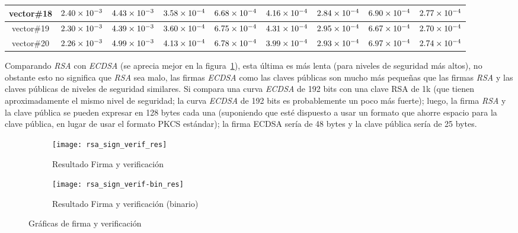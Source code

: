 \documentclass[../main.tex]{subfiles}
\begin{document}
\begin{table}[ht]
\begin{tabular}{|c|c|c|c|c|c|c|c|c|}
    \rowcolor[HTML]{C0C0C0}
    vector\#18 & $\num{2.40E-03}$ & $\num{4.43E-03}$ & $\num{3.58E-04}$ & $\num{6.68E-04}$ & $\num{4.16E-04}$ & $\num{2.84E-04}$ & $\num{6.90E-04}$ & $\num{2.77E-04}$ \\ \hline
    vector\#19 & $\num{2.30E-03}$ & $\num{4.39E-03}$ & $\num{3.60E-04}$ & $\num{6.75E-04}$ & $\num{4.31E-04}$ & $\num{2.95E-04}$ & $\num{6.67E-04}$ & $\num{2.70E-04}$ \\ \hline
    \rowcolor[HTML]{C0C0C0}
    vector\#20 & $\num{2.26E-03}$ & $\num{4.99E-03}$ & $\num{4.13E-04}$ & $\num{6.78E-04}$ & $\num{3.99E-04}$ & $\num{2.93E-04}$ & $\num{6.97E-04}$ & $\num{2.74E-04}$ \\ \hline
  \end{tabular}
\end{table}

Comparando \textit{RSA} con \textit{ECDSA} (se aprecia mejor en la figura~\ref{fig:fyv}),
esta última es más lenta (para niveles de seguridad más altos), no obstante esto no
significa que \textit{RSA} sea malo, las firmas \textit{ECDSA} como las claves públicas
son mucho más pequeñas que las firmas \textit{RSA} y las claves públicas de niveles de
seguridad similares. Si compara una curva \textit{ECDSA} de 192 bits con una clave RSA de
1k (que tienen aproximadamente el mismo nivel de seguridad; la curva \textit{ECDSA} de
192 bits es probablemente un poco más fuerte); luego, la firma \textit{RSA} y la clave
pública se pueden expresar en 128 bytes cada una (suponiendo que esté dispuesto a usar un
formato que ahorre espacio para la clave pública, en lugar de usar el formato PKCS
estándar); la firma ECDSA sería de 48 bytes y la clave pública sería de 25 bytes.
\begin{figure}[ht]\centering

\begin{subfigure}[b]{0.5\textwidth}
  \centering
  \texttt{[image: rsa\_sign\_verif\_res]}
  \caption{Resultado Firma y verificación}\label{fig:fyv}
\end{subfigure}
\hfill{}
\begin{subfigure}[b]{0.45\textwidth}
  \centering
  \texttt{[image: rsa\_sign\_verif-bin\_res]}
  \caption{Resultado Firma y verificación (binario)}\label{fig:fyvbin}
\end{subfigure}
\caption{Gráficas de firma y verificación}\label{fig:fv}
\end{figure}
\end{document}
